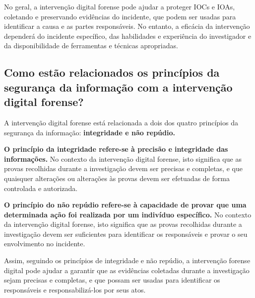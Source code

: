 No geral, a intervenção digital forense pode ajudar a proteger IOCs e IOAs, coletando e preservando evidências do incidente, que podem ser usadas para identificar a causa e as partes responsáveis. No entanto, a eficácia da intervenção dependerá do incidente específico, das habilidades e experiência do investigador e da disponibilidade de ferramentas e técnicas apropriadas.

\subsection[Extensão da pergunta 4]{Como estão relacionados os princípios da segurança da informação com a intervenção digital forense?}

A intervenção digital forense está relacionada a dois dos quatro princípios da segurança da informação: \textbf{integridade e não repúdio.}

\textbf{O princípio da integridade refere-se à precisão e integridade das informações.} No contexto da intervenção digital forense, isto significa que as provas recolhidas durante a investigação devem ser precisas e completas, e que quaisquer alterações ou alterações às provas devem ser efetuadas de forma controlada e autorizada.

\textbf{O princípio do não repúdio refere-se à capacidade de provar que uma determinada ação foi realizada por um indivíduo específico.} No contexto da intervenção digital forense, isto significa que as provas recolhidas durante a investigação devem ser suficientes para identificar os responsáveis e provar o seu envolvimento no incidente.

Assim, seguindo os princípios de integridade e não repúdio, a intervenção forense digital pode ajudar a garantir que as evidências coletadas durante a investigação sejam precisas e completas, e que possam ser usadas para identificar os responsáveis e responsabilizá-los por seus atos.

\newpage
